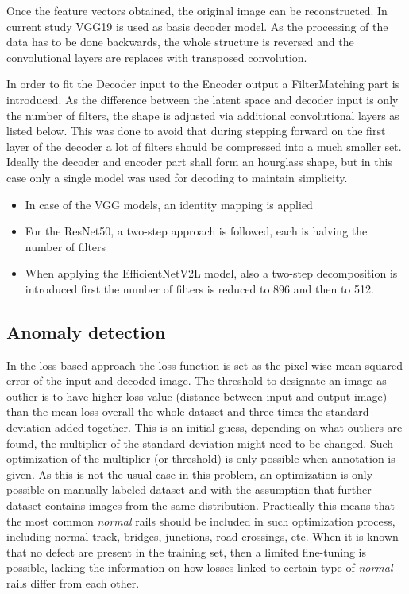 Once the feature vectors obtained, the original image can be reconstructed.
In current study VGG19 is used as basis decoder model.
As the processing of the data has to be done backwards, the whole structure is
reversed and the convolutional layers are replaces with transposed convolution.

In order to fit the Decoder input to the Encoder output a FilterMatching part is introduced.
As the difference between the latent space and decoder input is only the number of filters,
the shape is adjusted via additional convolutional layers as listed below.
This was done to avoid that during stepping forward on the first layer of the decoder a lot of
filters should be compressed into a much smaller set.
Ideally the decoder and encoder part shall form an hourglass shape, but in this case only a single
model was used for decoding to maintain simplicity.
\begin{itemize}
    \item In case of the VGG models, an identity mapping is applied
    \item For the ResNet50, a two-step approach is followed, each is halving the number of filters
    \item When applying the EfficientNetV2L model, also a two-step decomposition is introduced
          first the number of filters is reduced to 896 and then to 512.
\end{itemize}

\subsection{Anomaly detection}

In the loss-based approach the loss function is set as the pixel-wise mean squared error of the input
and decoded image.
The threshold to designate an image as outlier is to have higher loss value
(distance between input and output image) than the mean loss overall the whole dataset and
three times the standard deviation added together.
This is an initial guess, depending on what outliers are found, the multiplier of the standard
deviation might need to be changed.
Such optimization of the multiplier (or threshold) is only possible when annotation is given.
As this is not the usual case in this problem, an optimization is only possible on manually
labeled dataset and with the assumption that further dataset contains images from the same distribution.
Practically this means that the most common \emph{normal} rails should be included in such
optimization process, including normal track, bridges, junctions, road crossings, etc.
When it is known that no defect are present in the training set, then a limited fine-tuning
is possible, lacking the information on how losses linked to certain type of \emph{normal}
rails differ from each other.

